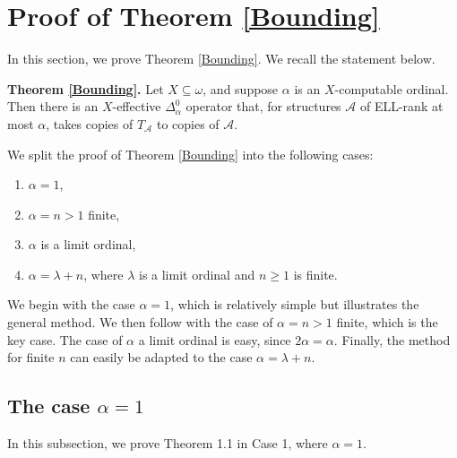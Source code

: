 \documentclass{article}
\newcommand{\ELL}{\textnormal{ELL}}
\theoremstyle{definition}
\begin{document}
	\section{Proof of Theorem \ref{Bounding}} \label{sec:mainproof}
	
	In this section, we prove Theorem \ref{Bounding}. We recall the statement below. 
	
	\bigskip
	\noindent
	\textbf{Theorem \ref{Bounding}.} Let $X\subseteq\omega$, and suppose $\alpha$ is an $X$-computable ordinal. Then there is an $X$-effective $\Delta^0_\alpha$ operator that, for structures $\mathcal{A}$ of \ELL-rank at most $\alpha$, takes copies of $T_\mathcal{A}$ to copies of $\mathcal{A}$. 
	
	
	\bigskip
	
	We split the proof of Theorem \ref{Bounding} into the following cases: 
	
	\begin{enumerate}
		
		\item $\alpha = 1$, 
		
		\item $\alpha = n > 1$ finite, 
		
		\item $\alpha$ is a limit ordinal, 
		
		\item $\alpha = \lambda + n$, where $\lambda$ is a limit ordinal and $n\geq 1$ is finite. 
		
	\end{enumerate}
	
	We begin with the case $\alpha = 1$, which is relatively simple but illustrates the general method. We then follow with the case of $\alpha = n > 1$ finite, which is the key case. The case of $\alpha$ a limit ordinal is easy, since $2\alpha = \alpha$. Finally, the method for finite $n$ can easily be adapted to the case $\alpha = \lambda + n$.
	
	\subsection{The case $\alpha = 1$}
	
	In this subsection, we prove Theorem 1.1 in Case 1, where $\alpha = 1$.
	
\end{document}
